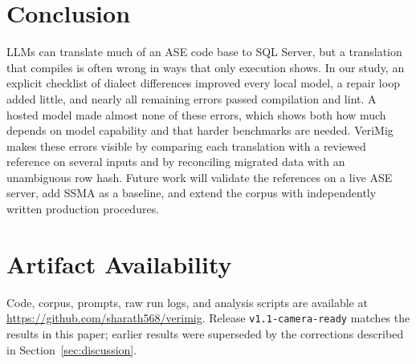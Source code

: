 \section{Conclusion}\label{sec:conclusion}

LLMs can translate much of an ASE code base to SQL Server, but a translation that compiles is often wrong
in ways that only execution shows. In our study, an explicit checklist of dialect differences improved
every local model, a repair loop added little, and nearly all remaining errors passed compilation and lint.
A hosted model made almost none of these errors, which shows both how much depends on model capability
and that harder benchmarks are needed.
VeriMig makes these errors visible by comparing each translation with a reviewed reference on several inputs
and by reconciling migrated data with an unambiguous row hash. Future work will validate the references on a
live ASE server, add SSMA as a baseline, and extend the corpus with independently written production
procedures.

\section*{Artifact Availability}
Code, corpus, prompts, raw run logs, and analysis scripts are available at
\url{https://github.com/sharath568/verimig}. Release \texttt{v1.1-camera-ready} matches the results in
this paper; earlier results were superseded by the corrections described in Section~\ref{sec:discussion}.
